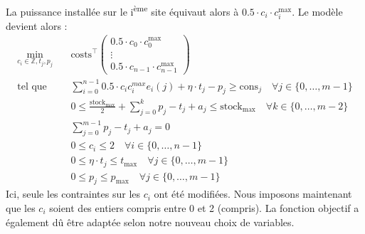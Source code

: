 \documentclass{article}
\begin{document}
\noindent La puissance installée sur le i\textsuperscript{ème} site équivaut alors à $0.5 \cdot c_i \cdot c_i^\mathrm{max}$. Le modèle devient alors :
\begin{align}
    \min_{c_{i} \in \mathbb{Z},t_j,p_j} \quad &\mathrm{costs}^\intercal 
    \begin{pmatrix}
        0.5 \cdot c_0 \cdot c_0^\mathrm{max}\\
        \vdots\\
        0.5 \cdot c_{n-1} \cdot c_{n-1}^\mathrm{max}
    \end{pmatrix} \nonumber\\
    \textrm{tel que} \quad & \sum_{i=0}^{n-1} 0.5 \cdot c_ic_i^{max} e_i(j) + \eta \cdot t_j - p_j \ge \mathrm{cons}_j \quad \forall j \in  \{ 0, \ldots, m-1 \}\label{eq:5_contr1}\\
    & 0 \le \frac{\mathrm{stock}_\mathrm{max}}{2}  + \sum_{j=0}^{k} p_j - t_j + a_j \le  \mathrm{stock}_\mathrm{max} \quad \forall k \in \{ 0, \ldots, m-2 \}\label{eq:5_contr2}\\
    & \sum_{j=0}^{m-1} p_j - t_j + a_j = 0 \label{eq:5_contr3}\\
    & 0\le c_i \le 2 \quad \forall i \in  \{ 0, \ldots, n-1 \} \label{eq:5_contr4}  \\
    & 0 \le \eta \cdot t_j \le  t_\mathrm{max} \quad \forall j \in  \{ 0, \ldots, m-1 \} \label{eq:5_contr5}\\
    & 0 \le p_j \le  p_\mathrm{max} \quad \forall j \in  \{ 0, \ldots, m-1 \} \label{eq:5_contr6} 
\end{align}
Ici, seule les contraintes sur les $c_i$ ont été modifiées. Nous imposons maintenant que les $c_i$ soient des entiers compris entre 0 et 2 (compris).
La fonction objectif a également dû être adaptée selon notre nouveau choix de variables.

\pagebreak
\end{document}
